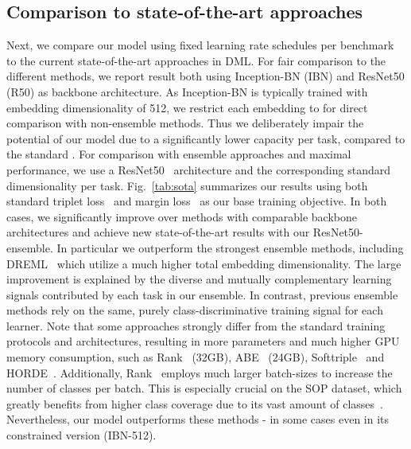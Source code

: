 \documentclass[runningheads]{llncs}
\begin{document}
\subsection{Comparison to state-of-the-art approaches}
Next, we compare our model using fixed learning rate schedules per benchmark to the current state-of-the-art approaches in DML. For fair comparison to the different methods, we report result both using Inception-BN (IBN) and ResNet50 (R50) as backbone architecture. As Inception-BN is typically trained with embedding dimensionality of 512, we restrict each embedding to  for direct comparison with non-ensemble methods. Thus we deliberately impair the potential of our model due to a significantly lower capacity per task, compared to the standard . For comparison with ensemble approaches and maximal performance, we use a ResNet50~\cite{margin,mic,Sanakoyeu_2019_CVPR} architecture and the corresponding standard dimensionality  per task. Fig.~\ref{tab:sota} summarizes our results using both standard triplet loss~\cite{semihard} and margin loss~\cite{margin} as our base training objective. In both cases, we significantly improve over methods with comparable backbone architectures and achieve new state-of-the-art results with our ResNet50-ensemble. In particular we outperform the strongest ensemble methods, including DREML~\cite{dreml} which utilize a much higher total embedding dimensionality. The large improvement is explained by the diverse and mutually complementary learning signals contributed by each task in our ensemble. In contrast, previous ensemble methods rely on the same, purely class-discriminative training signal for each learner. Note that some approaches strongly differ from the standard training protocols and architectures, resulting in more parameters and much higher GPU memory consumption, such as Rank~\cite{rankedlist} (32GB), ABE~\cite{abe} (24GB), Softtriple~\cite{softriple} and HORDE~\cite{horde}. Additionally, Rank~\cite{rankedlist} employs much larger batch-sizes to increase the number of classes per batch. This is especially crucial on the SOP dataset, which greatly benefits from higher class coverage due to its vast amount of classes~\cite{roth2020revisiting}. Nevertheless, our model outperforms these methods - in some cases even in its constrained version (IBN-512).
\end{document}
